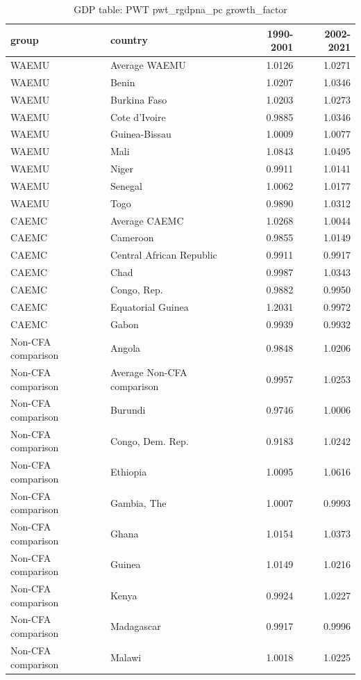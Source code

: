 \begin{table}

\caption{GDP table: PWT pwt_rgdpna_pc growth_factor}
\centering
\begin{tabular}[t]{llrr}
\toprule
group & country & 1990-2001 & 2002-2021\\
\midrule
WAEMU & Average WAEMU & 1.0126 & 1.0271\\
WAEMU & Benin & 1.0207 & 1.0346\\
WAEMU & Burkina Faso & 1.0203 & 1.0273\\
WAEMU & Cote d'Ivoire & 0.9885 & 1.0346\\
WAEMU & Guinea-Bissau & 1.0009 & 1.0077\\
\addlinespace
WAEMU & Mali & 1.0843 & 1.0495\\
WAEMU & Niger & 0.9911 & 1.0141\\
WAEMU & Senegal & 1.0062 & 1.0177\\
WAEMU & Togo & 0.9890 & 1.0312\\
CAEMC & Average CAEMC & 1.0268 & 1.0044\\
\addlinespace
CAEMC & Cameroon & 0.9855 & 1.0149\\
CAEMC & Central African Republic & 0.9911 & 0.9917\\
CAEMC & Chad & 0.9987 & 1.0343\\
CAEMC & Congo, Rep. & 0.9882 & 0.9950\\
CAEMC & Equatorial Guinea & 1.2031 & 0.9972\\
\addlinespace
CAEMC & Gabon & 0.9939 & 0.9932\\
Non-CFA comparison & Angola & 0.9848 & 1.0206\\
Non-CFA comparison & Average Non-CFA comparison & 0.9957 & 1.0253\\
Non-CFA comparison & Burundi & 0.9746 & 1.0006\\
Non-CFA comparison & Congo, Dem. Rep. & 0.9183 & 1.0242\\
\addlinespace
Non-CFA comparison & Ethiopia & 1.0095 & 1.0616\\
Non-CFA comparison & Gambia, The & 1.0007 & 0.9993\\
Non-CFA comparison & Ghana & 1.0154 & 1.0373\\
Non-CFA comparison & Guinea & 1.0149 & 1.0216\\
Non-CFA comparison & Kenya & 0.9924 & 1.0227\\
\addlinespace
Non-CFA comparison & Madagascar & 0.9917 & 0.9996\\
Non-CFA comparison & Malawi & 1.0018 & 1.0225\\

\end{tabular}
\end{table}
